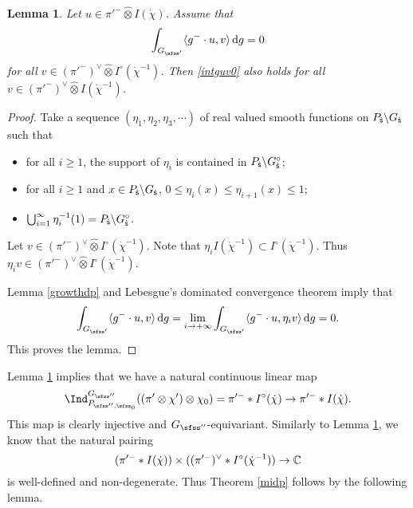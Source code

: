 \documentclass[12pt,a4paper]{amsart}
\newcommand{\od}{\operatorname{d}}
\newcommand{\la}{\langle}
\newcommand{\ra}{\rangle}
\numberwithin{equation}{section}
\newtheorem{lem}[thm]{Lemma}
\theoremstyle{remark}
\begin{document}
\begin{lem}\label{imb}
Let $u\in \pi'^- \widehat \otimes{ I(\dot \chi)}$. Assume that
\begin{equation}\label{intguv0}
  \int_{G_{\sfss'}} \la g^-\cdot u, v\ra\od\! g =0
\end{equation}
for all $v\in (\pi'^-)^\vee \widehat \otimes I^\circ (\dot \chi^{-1})$. Then \eqref{intguv0} also holds for all $v\in (\pi'^-)^\vee \widehat \otimes I(\dot \chi^{-1})$.
\end{lem}

\begin{proof}
Take a sequence $(\eta_1, \eta_2, \eta_3, \cdots)$ of real valued smooth functions on $P_{{\dot{\mathsf s}}}\backslash G_{{\dot{\mathsf s}}}$ such that
\begin{itemize}
\item
for all $i\geq 1$,  the support of $\eta_i$ is contained in $P_{\dot{\mathsf s}} \backslash  G_{\dot{\mathsf s}}^\circ$;
\item for all $i\geq 1$ and  $x\in  P_{{\dot{\mathsf s}}}\backslash G_{{\dot{\mathsf s}}}$, $ 0\leq  \eta_i(x)\leq \eta_{i+1}(x)\leq 1$; \smallskip
 \item
 $\bigcup_{i=1}^\infty \eta_i^{-1}(1)= P_{{\dot{\mathsf s}}}\backslash G_{{\dot{\mathsf s}}}^\circ$.
\end{itemize}
Let $v\in  (\pi'^-)^\vee \widehat \otimes I^\circ (\dot \chi^{-1})$. Note that $\eta_i  I (\dot \chi^{-1})\subset  I^\circ (\dot \chi^{-1})$. Thus $\eta_i v\in (\pi'^-)^\vee \widehat \otimes  I^\circ (\dot \chi^{-1})$.

Lemma \ref{growthdp} and  Lebesgue's dominated convergence theorem imply that
\[
  \int_{G_{\sfss'}} \la g^-\cdot u, v\ra\od\! g
  =\lim_{i\rightarrow +\infty}  \int_{G_{\sfss'}} \la g^-\cdot u, \eta_i v\ra \od\! g =0.
\]
This proves the lemma.

\end{proof}

Lemma \ref{imb} implies that we have a natural continuous  linear map
\[
 \Ind_{P_{\sfss'',\sfss_0}}^{G_{\sfss''}} ((\pi'\otimes  \chi')\otimes \chi_0)= \pi'^-* I^\circ (\dot \chi)\rightarrow \pi'^-* I(\dot \chi).
\]
This map is clearly  injective and $G_{\sfss''}$-equivariant. Similarly to Lemma \ref{imb}, we know that the natural pairing
\[
 ( \pi'^-* I(\dot \chi))\times( (\pi'^-)^\vee* I^\circ(\dot \chi^{-1}))\rightarrow \mathbb{C}
\]
is well-defined and non-degenerate. Thus Theorem \ref{midp} follows by the following lemma.

\end{document}
